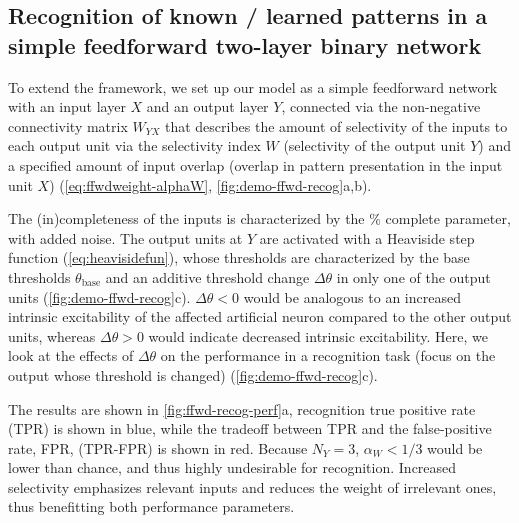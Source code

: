\subsection{Recognition of known / learned patterns in a simple feedforward two-layer binary network}



To extend the framework, we set up our model as a simple feedforward network
    with an input layer $X$ and an output layer $Y$,
    connected via the non-negative connectivity matrix $W_{YX}$
        that describes the amount of selectivity of the inputs to each output unit via
            the selectivity index $W$ (selectivity of the output unit $Y$)
            and a specified amount of input overlap (overlap in pattern presentation in the input unit $X$)
            (\autoref{eq:ffwdweight-alphaW}, \autoref{fig:demo-ffwd-recog}a,b).

The (in)completeness of the inputs is characterized by
        the \% complete parameter, with added noise.
    The output units at $Y$ are activated with a Heaviside step function (\autoref{eq:heavisidefun}), whose thresholds are characterized by
        the base thresholds $\theta_{\text{base}}$
        and an additive threshold change $\Delta \theta$ in only one of the output units (\autoref{fig:demo-ffwd-recog}c).
    $\Delta \theta < 0$ would be analogous to an increased intrinsic excitability of the affected artificial neuron compared to the other output units,
        whereas $\Delta \theta > 0$ would indicate decreased intrinsic excitability.
    Here, we look at the effects of $\Delta \theta$ on the performance in a recognition task
        (focus on the output whose threshold is changed) (\autoref{fig:demo-ffwd-recog}c).

The results are shown in \autoref{fig:ffwd-recog-perf}a,
        recognition true positive rate (TPR) is shown in blue,
        while the tradeoff between TPR and the false-positive rate, FPR, (TPR-FPR) is shown in red.
    Because $N_Y=3$, $\alpha_W < 1/3$ would be lower than chance,
        and thus highly undesirable for recognition.
    Increased selectivity emphasizes relevant inputs and reduces the weight of irrelevant ones, thus benefitting both performance parameters.



